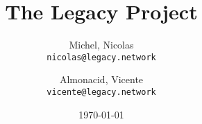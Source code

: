 \documentclass[12pt,french,english]{report} %
\newcommand{\bibpath}{.}
\begin{document}
\title{The Legacy Project}
\author{
  Michel, Nicolas\\
  \texttt{nicolas@legacy.network}
  \and
  Almonacid, Vicente\\
  \texttt{vicente@legacy.network}
}
\date{\today}
\maketitle


\tableofcontents













%
%
%
%
\printbibliography
		
\end{document}

